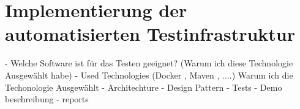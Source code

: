 \chapter{Implementierung der automatisierten Testinfrastruktur}
- Welche Software ist für das Testen geeignet? (Warum ich diese Technologie Ausgewählt habe)
- Used Technologies (Docker , Maven , ....) Warum ich die Techonologie Ausgewählt
- Architechture
- Design Pattern
- Tests
- Demo beschreibung
-  reports